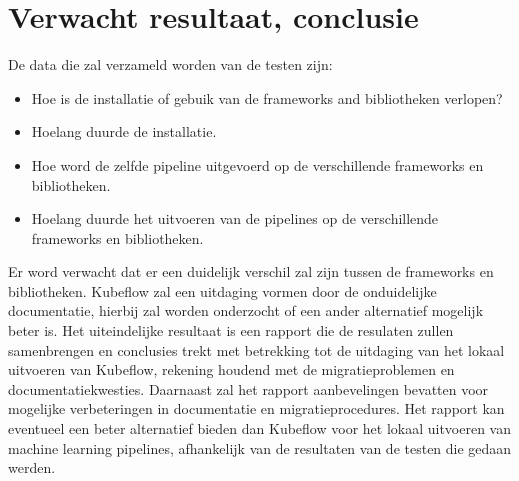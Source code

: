



\section{Verwacht resultaat, conclusie}%
\label{sec:verwachte_resultaten}
De data die zal verzameld worden van de testen zijn:
\begin{itemize}
  \item Hoe is de installatie of gebuik van de frameworks and bibliotheken verlopen?
  \item Hoelang duurde de installatie.
  \item Hoe word de zelfde pipeline uitgevoerd op de verschillende frameworks en bibliotheken.
  \item Hoelang duurde het uitvoeren van de pipelines op de verschillende frameworks en bibliotheken.
\end{itemize}

Er word verwacht dat er een duidelijk verschil zal zijn tussen de frameworks en bibliotheken. Kubeflow zal een uitdaging vormen door de onduidelijke documentatie, hierbij zal worden onderzocht of een ander alternatief mogelijk beter is.
Het uiteindelijke resultaat is een rapport die de resulaten zullen samenbrengen en conclusies trekt met betrekking tot de uitdaging van het lokaal uitvoeren van Kubeflow, rekening houdend met de migratieproblemen en documentatiekwesties. Daarnaast zal het rapport aanbevelingen bevatten voor mogelijke verbeteringen in documentatie en migratieprocedures. Het rapport kan eventueel een beter alternatief bieden dan Kubeflow voor het lokaal uitvoeren van machine learning pipelines, afhankelijk van de resultaten van de testen die gedaan werden.

